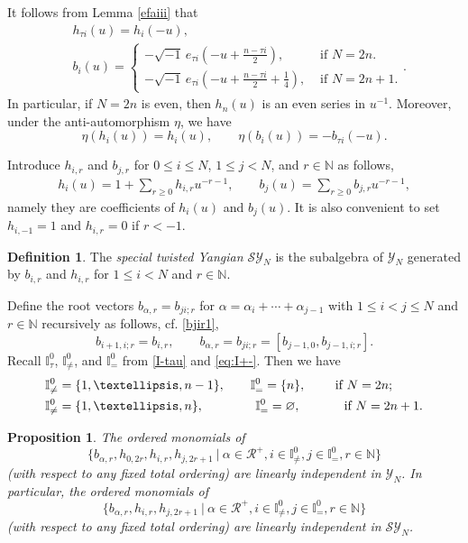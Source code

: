 \documentclass[11pt,reqno]{amsart}
\numberwithin{equation}{section}
\newtheorem{prop}[thm]{Proposition}
\theoremstyle{definition}
\newtheorem{dfn}[thm]{Definition}
\theoremstyle{remark}
\newcommand{\beq}{\begin{equation}}
\newcommand{\eeq}{\end{equation}}
\newcommand{\bN}{\mathbb{N}}
\newcommand{\cR}{\mathcal{R}}
\newcommand{\gge}{\geqslant}
\newcommand{\lle}{\leqslant}
\newcommand{\Y}{{\mathscr{Y}}}
\newcommand{\SY}{{\mathscr{SY}}}
\def \I{\mathbb{I}}
\def \N{\mathbb{N}}
\begin{document}
It follows from Lemma \ref{efaiii} that
\begin{align}
\label{i=tauih}
&h_{\tau i}(u)=h_{i}(-u),\\  
&b_{i}(u)=\begin{cases}
-\sqrt{-1}\,e_{\tau i}(-u+\tfrac{n- \tau i}{2}),&\text{ if }N=2n.\\
-\sqrt{-1}\,e_{\tau i}(-u+\tfrac{n- \tau i}{2}+\frac{1}{4}), &\text{ if }N=2n+1.
\end{cases}.\label{fi=tauie}
\end{align}
In particular, if $N=2n$ is even, then $h_n(u)$ is an even series in $u^{-1}$. Moreover, under the anti-automorphism $\eta$, we have
\beq\label{etahb}
\eta (h_i(u))=h_i(u),\qquad \eta(b_{i}(u))=-b_{\tau i}(-u).
\eeq

Introduce $h_{i,r}$ and $b_{j,r}$ for $0\lle i\lle N$, $1\lle j<N$, and $r\in\bN$ as follows,
\begin{align}
h_i(u)=1+\sum_{r\gge 0}h_{i,r}u^{-r-1},\qquad b_j(u)=\sum_{r\gge 0}b_{j,r}u^{-r-1},\label{bhcom}
\end{align}
namely they are coefficients of $h_i(u)$ and $b_j(u)$. It is also convenient to set $h_{i,-1}=1$ and $h_{i,r}=0$ if $r<-1$.
\begin{dfn}\label{defSY}
The \emph{special twisted Yangian $\SY_N$} is the subalgebra of $\Y_N$ generated by $b_{i,r}$ and $h_{i,r}$ for $1\lle i<N$ and $r\in\bN$.    
\end{dfn}

Define the root vectors $b_{\alpha,r}=b_{ji;r}$ for $\alpha=\alpha_i+\cdots+\alpha_{j-1}$ with $1\lle i<j\lle N$ and $r\in\bN$ recursively as follows, cf. \eqref{bjir1}, 
\beq\label{bjir2}
b_{i+1,i;r}=b_{i,r},\qquad b_{\alpha,r}=b_{ji;r}=[b_{j-1,0},b_{j-1,i;r}].
\eeq
Recall $\I_\tau^0$, $\I_{\ne}^0$, and $\I_{=}^0$ from \eqref{I-tau} and \eqref{eq:I+-}. Then we have
\beq\label{I+-A}
\begin{split}
&\I_{\ne}^0=\{1,\dots,n-1\},\qquad \I_{=}^0=\{n\},\qquad \text{ if }N=2n;\\
&\I_{\ne}^0=\{1,\dots,n\},\hskip 1.45cm \I_{=}^0=\varnothing,\hskip 1.1cm \text{ if }N=2n+1.
\end{split}
\eeq
\begin{prop}\label{prop:pwb}
The ordered monomials of 
\beq\label{dd34}
\{b_{\alpha,r},h_{0,2r},h_{i,r},h_{j,2r+1}~|~\alpha\in\cR^+,i\in\I^0_{\ne},j\in\I_{=}^0,r\in\N\}
\eeq
(with respect to any fixed total ordering) are linearly independent in  $\Y_N$. In particular, the ordered monomials of 
$$
\{b_{\alpha,r},h_{i,r},h_{j,2r+1}~|~\alpha\in\cR^+,i\in\I_{\ne}^0,j\in\I_{=}^0,r\in\N\}
$$ 
(with respect to any fixed total ordering) are linearly independent in  $\SY_N$.
\end{prop}
\end{document}
